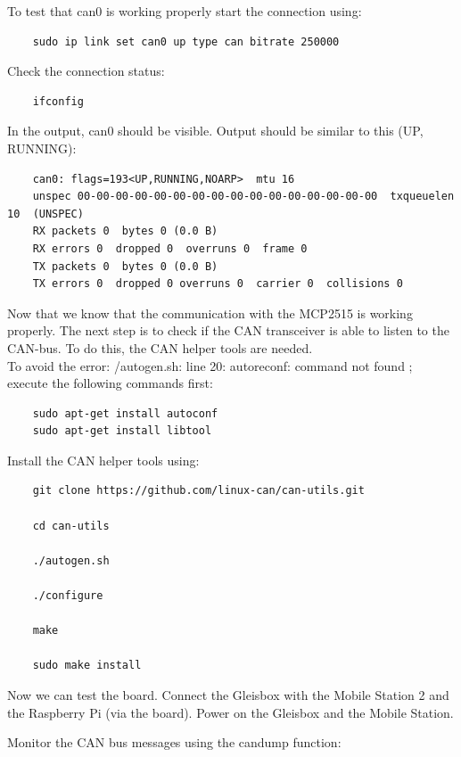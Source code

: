 To test that can0 is working properly start the connection using:

\begin{verbatim}
	sudo ip link set can0 up type can bitrate 250000
\end{verbatim}

Check the connection status:

\begin{verbatim}
	ifconfig
\end{verbatim}

In the output, can0 should be visible. Output should be similar to this (UP, RUNNING):

\begin{verbatim}
	can0: flags=193<UP,RUNNING,NOARP>  mtu 16
	unspec 00-00-00-00-00-00-00-00-00-00-00-00-00-00-00-00  txqueuelen 10  (UNSPEC)
	RX packets 0  bytes 0 (0.0 B)
	RX errors 0  dropped 0  overruns 0  frame 0
	TX packets 0  bytes 0 (0.0 B)
	TX errors 0  dropped 0 overruns 0  carrier 0  collisions 0
\end{verbatim}

Now that we know that the communication with the MCP2515 is working properly. The next step is to check if the CAN transceiver is able to listen to the CAN-bus. To do this, the CAN helper tools are needed. \\

To avoid the error: /autogen.sh: line 20: autoreconf: command not found ; execute the following commands first:

\begin{verbatim}
	sudo apt-get install autoconf
	sudo apt-get install libtool
\end{verbatim}

Install the CAN helper tools using:

\begin{verbatim}
	git clone https://github.com/linux-can/can-utils.git
	
	cd can-utils
	
	./autogen.sh
	
	./configure
	
	make
	
	sudo make install
\end{verbatim}

Now we can test the board. Connect the Gleisbox with the Mobile Station 2 and the Raspberry Pi (via the board). Power on the Gleisbox and the Mobile Station.

Monitor the CAN bus messages using the candump function:

